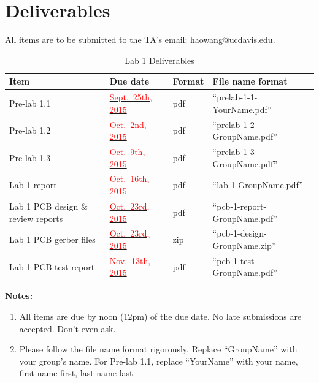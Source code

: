 \documentclass[letterpaper, 11pt]{article}
\newcommand{\due}[1]{\href{https://github.com/ucdart/UCD-EEC134/blob/master/support/schedule/eec134-schedule.pdf}{\textcolor{red}{#1}}}
\begin{document}
\newpage
\section{Deliverables}
All items are to be submitted to the TA's email: haowang@ucdavis.edu.  

\vspace{0.5cm}

\begin{table}[h]
	\footnotesize
	\caption{Lab 1 Deliverables}
	\renewcommand{\arraystretch}{1.2}
	\begin{tabular}{|m{1in}|l|m{0.45in}|m{2in}|}
		\hline
		\textbf{Item} & \textbf{Due date} & \textbf{Format} & \textbf{File name format} \\
		\hline \hline
		Pre-lab 1.1 & \due{Sept.~25th, 2015 } & pdf & ``prelab-1-1-YourName.pdf'' \\
		\hline
		Pre-lab 1.2 & \due{Oct.~2nd, 2015} & pdf & ``prelab-1-2-GroupName.pdf''\\
		\hline
		Pre-lab 1.3 & \due{Oct.~9th, 2015} & pdf & ``prelab-1-3-GroupName.pdf''\\
		\hline
		Lab 1 report & \due{Oct.~16th, 2015} & pdf & ``lab-1-GroupName.pdf''\\
		\hline
		Lab 1 PCB design \& review reports & \due{Oct.~23rd, 2015} & pdf & ``pcb-1-report-GroupName.pdf''\\
		\hline
		Lab 1 PCB gerber files & \due{Oct.~23rd, 2015} & zip & ``pcb-1-design-GroupName.zip''\\
		\hline
		Lab 1 PCB test report & \due{Nov.~13th, 2015} & pdf & ``pcb-1-test-GroupName.pdf''\\
		\hline
	\end{tabular}
	\label{tab:deliverables}
\end{table}

\textbf{Notes:}
\begin{enumerate}
	\item All items are due by noon (12pm) of the due date. No late submissions are accepted. Don't even ask. 
	
	\item Please follow the file name format rigorously. Replace ``GroupName'' with your group's name. For Pre-lab 1.1, replace ``YourName'' with your name, first name first, last name last. 
\end{enumerate}
\end{document}
